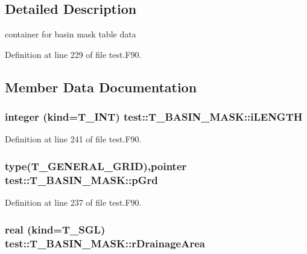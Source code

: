 \subsection{Detailed Description}
container for basin mask table data 

Definition at line 229 of file test.F90.



\subsection{Member Data Documentation}
\hypertarget{typetest_1_1_t___b_a_s_i_n___m_a_s_k_a30fd77abc485e4251ed9c7bc001f96a4}{
\subsubsection[{iLENGTH}]{\setlength{\rightskip}{0pt plus 5cm}integer (kind={\bf T\_\-INT}) {\bf test::T\_\-BASIN\_\-MASK::iLENGTH}}}
\label{typetest_1_1_t___b_a_s_i_n___m_a_s_k_a30fd77abc485e4251ed9c7bc001f96a4}


Definition at line 241 of file test.F90.

\hypertarget{typetest_1_1_t___b_a_s_i_n___m_a_s_k_a445aa988a4cfc4b2f0c5c6edf2f9aeb0}{
\subsubsection[{pGrd}]{\setlength{\rightskip}{0pt plus 5cm}type({\bf T\_\-GENERAL\_\-GRID}),pointer {\bf test::T\_\-BASIN\_\-MASK::pGrd}}}
\label{typetest_1_1_t___b_a_s_i_n___m_a_s_k_a445aa988a4cfc4b2f0c5c6edf2f9aeb0}


Definition at line 237 of file test.F90.

\hypertarget{typetest_1_1_t___b_a_s_i_n___m_a_s_k_a2c9ca5d8db32aa7a6716714e41904aaf}{
\subsubsection[{rDrainageArea}]{\setlength{\rightskip}{0pt plus 5cm}real (kind={\bf T\_\-SGL}) {\bf test::T\_\-BASIN\_\-MASK::rDrainageArea}}}
\label{typetest_1_1_t___b_a_s_i_n___m_a_s_k_a2c9ca5d8db32aa7a6716714e41904aaf}


